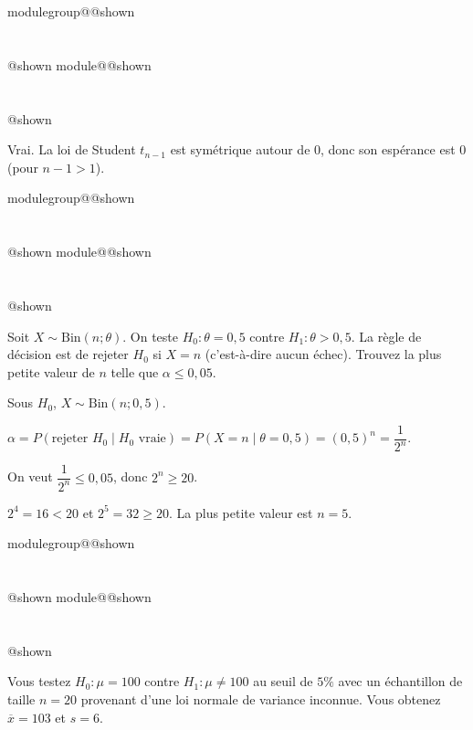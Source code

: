 \documentclass{Evaluation}
\makeatletter
\newcommand{\currentmodulekey}{}
\newcommand{\currentmoduletitle}{}
\newcommand{\currentgroupkey}{}
\newcommand{\currentgrouptitle}{}
\newcommand{\showmoduleifneeded}{%
  \ifx\currentgroupkey\empty\else
    \expandafter\ifx\csname modulegroup@\currentgroupkey @shown\endcsname\relax
      \section*{\currentgrouptitle}%
      \expandafter\gdef\csname modulegroup@\currentgroupkey @shown\endcsname{1}%
    \fi
  \fi
  \expandafter\ifx\csname module@\currentmodulekey @shown\endcsname\relax
    \section*{\currentmoduletitle}%
    \expandafter\gdef\csname module@\currentmodulekey @shown\endcsname{1}%
  \fi
}
\newenvironment{A25}{\showmoduleifneeded}{}
\makeatother
\begin{document}
\begin{questions}
\begin{A25}
\begin{solution}
    Vrai. La loi de Student $t_{n-1}$ est symétrique autour de $0$, donc son espérance est $0$ (pour $n-1 > 1$).
\end{solution}
\end{A25}

\begin{A25}
\question Soit $X\sim \text{Bin}(n;\theta)$. On teste $H_0:\theta=0{,}5$ contre $H_1:\theta > 0{,}5$. La règle de décision est de rejeter $H_0$ si $X=n$ (c'est-à-dire aucun échec). Trouvez la plus petite valeur de $n$ telle que $\alpha \leq 0{,}05$.

\begin{solution}
    Sous $H_0$, $X\sim\text{Bin}(n; 0{,}5)$.

    $\alpha = P(\text{rejeter } H_0 \mid H_0 \text{ vraie}) = P(X = n \mid \theta=0{,}5) = (0{,}5)^n = \dfrac{1}{2^n}$.

    On veut $\dfrac{1}{2^n} \leq 0{,}05$, donc $2^n \geq 20$.

    $2^4 = 16 < 20$ et $2^5 = 32 \geq 20$. La plus petite valeur est $n=5$.
\end{solution}
\end{A25}

\begin{A25}
\question Vous testez $H_0: \mu=100$ contre $H_1:\mu\neq 100$ au seuil de $5\%$ avec un échantillon de taille $n=20$ provenant d'une loi normale de variance inconnue. Vous obtenez $\overline{x}=103$ et $s=6$.

\end{A25}
\end{questions}
\end{document}
